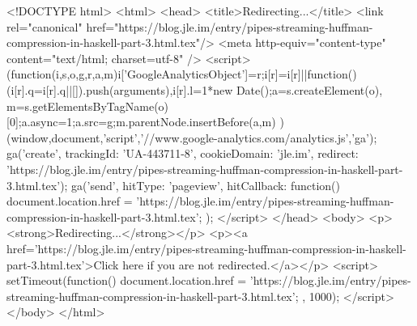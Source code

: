 <!DOCTYPE html>
<html>
<head>
<title>Redirecting...</title>
<link rel="canonical" href="https://blog.jle.im/entry/pipes-streaming-huffman-compression-in-haskell-part-3.html.tex"/>
<meta http-equiv="content-type" content="text/html; charset=utf-8" />
<script>
(function(i,s,o,g,r,a,m){i['GoogleAnalyticsObject']=r;i[r]=i[r]||function(){
(i[r].q=i[r].q||[]).push(arguments)},i[r].l=1*new Date();a=s.createElement(o),
m=s.getElementsByTagName(o)[0];a.async=1;a.src=g;m.parentNode.insertBefore(a,m)
})(window,document,'script','//www.google-analytics.com/analytics.js','ga');
ga('create', { trackingId: 'UA-443711-8', cookieDomain: 'jle.im', redirect: 'https://blog.jle.im/entry/pipes-streaming-huffman-compression-in-haskell-part-3.html.tex'});
ga('send', { hitType: 'pageview', hitCallback: function() { document.location.href = 'https://blog.jle.im/entry/pipes-streaming-huffman-compression-in-haskell-part-3.html.tex'; } });
</script>
</head>
<body>
  <p><strong>Redirecting...</strong></p>
  <p><a href='https://blog.jle.im/entry/pipes-streaming-huffman-compression-in-haskell-part-3.html.tex'>Click here if you are not redirected.</a></p>
  <script>
    setTimeout(function() { document.location.href = 'https://blog.jle.im/entry/pipes-streaming-huffman-compression-in-haskell-part-3.html.tex'; }, 1000);
  </script>
</body>
</html>
